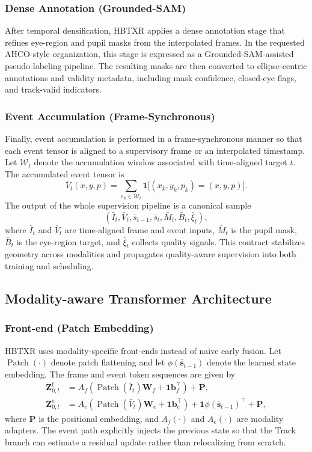 \documentclass[journal]{IEEEtran}
\begin{document}
\subsubsection{Dense Annotation (Grounded-SAM)}
After temporal densification, HBTXR applies a dense annotation stage that refines eye-region and pupil masks from the interpolated frames. In the requested AHCO-style organization, this stage is expressed as a Grounded-SAM-assisted pseudo-labeling pipeline. The resulting masks are then converted to ellipse-centric annotations and validity metadata, including mask confidence, closed-eye flags, and track-valid indicators.

\subsubsection{Event Accumulation (Frame-Synchronous)}
Finally, event accumulation is performed in a frame-synchronous manner so that each event tensor is aligned to a supervisory frame or an interpolated timestamp. Let $\mathcal W_t$ denote the accumulation window associated with time-aligned target $t$. The accumulated event tensor is
\begin{equation}
\bar V_t(x,y,p)=\sum_{e_k\in \mathcal W_t}
\mathbf{1}\big[(x_k,y_k,p_k)=(x,y,p)\big].
\end{equation}
The output of the whole supervision pipeline is a canonical sample
\begin{equation}
(\bar I_t, \bar V_t, \bar s_{t-1}, \bar s_t, \bar M_t, \bar B_t, \bar\xi_t),
\end{equation}
where $\bar I_t$ and $\bar V_t$ are time-aligned frame and event inputs, $\bar M_t$ is the pupil mask, $\bar B_t$ is the eye-region target, and $\bar\xi_t$ collects quality signals. This contract stabilizes geometry across modalities and propagates quality-aware supervision into both training and scheduling.

\subsection{Modality-aware Transformer Architecture}
\subsubsection{Front-end (Patch Embedding)}
HBTXR uses modality-specific front-ends instead of naive early fusion. Let $\operatorname{Patch}(\cdot)$ denote patch flattening and let $\phi(\bar{\mathbf s}_{t-1})$ denote the learned state embedding. The frame and event token sequences are given by
\begin{align}
\mathbf Z_{0,t}^{\mathrm{f}} &=
A_f\!\left(\operatorname{Patch}(\bar I_t)\mathbf W_f + \mathbf 1\mathbf b_f^{\top}\right)+\mathbf P,
\\
\mathbf Z_{0,t}^{\mathrm{e}} &=
A_e\!\left(\operatorname{Patch}(\bar V_t)\mathbf W_e + \mathbf 1\mathbf b_e^{\top}\right)
+ \mathbf 1\phi(\bar{\mathbf s}_{t-1})^{\top}+\mathbf P,
\end{align}
where $\mathbf P$ is the positional embedding, and $A_f(\cdot)$ and $A_e(\cdot)$ are modality adapters. The event path explicitly injects the previous state so that the Track branch can estimate a residual update rather than relocalizing from scratch.
\end{document}
